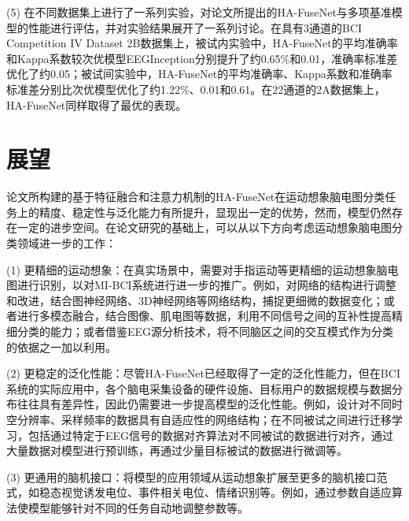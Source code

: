 (5) 在不同数据集上进行了一系列实验，对论文所提出的HA-FuseNet与多项基准模型的性能进行评估，并对实验结果展开了一系列讨论。在具有3通道的BCI Competition IV Dataset 2B数据集上，被试内实验中，HA-FuseNet的平均准确率和Kappa系数较次优模型EEGInception分别提升了约0.65\%和0.01，准确率标准差优化了约0.05；被试间实验中，HA-FuseNet的平均准确率、Kappa系数和准确率标准差分别比次优模型优化了约1.22\%、0.01和0.61。在22通道的2A数据集上，HA-FuseNet同样取得了最优的表现。

\section{展望}

论文所构建的基于特征融合和注意力机制的HA-FuseNet在运动想象脑电图分类任务上的精度、稳定性与泛化能力有所提升，显现出一定的优势，然而，模型仍然存在一定的进步空间。在论文研究的基础上，可以从以下方向考虑运动想象脑电图分类领域进一步的工作：

(1) 更精细的运动想象：在真实场景中，需要对手指运动等更精细的运动想象脑电图进行识别，以对MI-BCI系统进行进一步的推广。例如，对网络的结构进行调整和改进，结合图神经网络、3D神经网络等网络结构，捕捉更细微的数据变化；或者进行多模态融合，结合图像、肌电图等数据，利用不同信号之间的互补性提高精细分类的能力；或者借鉴EEG源分析技术，将不同脑区之间的交互模式作为分类的依据之一加以利用。

(2) 更稳定的泛化性能：尽管HA-FuseNet已经取得了一定的泛化性能力，但在BCI系统的实际应用中，各个脑电采集设备的硬件设施、目标用户的数据规模与数据分布往往具有差异性，因此仍需要进一步提高模型的泛化性能。例如，设计对不同时空分辨率、采样频率的数据具有自适应性的网络结构；在不同被试之间进行迁移学习，包括通过特定于EEG信号的数据对齐算法对不同被试的数据进行对齐，通过大量数据对模型进行预训练，再通过少量目标被试的数据进行微调等。

(3) 更通用的脑机接口：将模型的应用领域从运动想象扩展至更多的脑机接口范式，如稳态视觉诱发电位、事件相关电位、情绪识别等。例如，通过参数自适应算法使模型能够针对不同的任务自动地调整参数等。